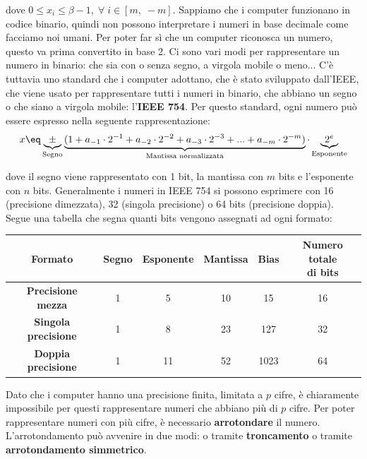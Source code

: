 dove $0 \leq x_i \leq \beta - 1, \; \forall \; i \in [m, \; -m]$.
\nl
Sappiamo che i computer funzionano in codice binario, quindi non possono interpretare i numeri in base decimale come facciamo noi umani. Per poter far sì che un computer riconosca un numero, questo va prima convertito in base 2. Ci sono vari modi per rappresentare un numero in binario: che sia con o senza segno, a virgola mobile o meno... C'è tuttavia uno standard che i computer adottano, che è stato sviluppato dall'IEEE, che viene usato per rappresentare tutti i numeri in binario, che abbiano un segno o che siano a virgola mobile: l'\textbf{IEEE 754}.
\nl
Per questo standard, ogni numero può essere espresso nella seguente rappresentazione:
\[ x \eq \underbrace{\pm}_{\text{Segno}} \underbrace{(1 + a_{-1} \cdot 2^{-1} + a_{-2} \cdot 2^{-2} + a_{-3} \cdot 2^{-3} + ... + a_{-m} \cdot 2^{-m})}_{\text{Mantissa normalizzata}} \cdot \underbrace{2^e}_{\text{Esponente}} \]

dove il segno viene rappresentato con 1 bit, la mantissa con $m$ bits e l'esponente con $n$ bits. Generalmente i numeri in IEEE 754 si possono esprimere con 16 (precisione dimezzata), 32 (singola precisione) o 64 bits (precisione doppia). Segue una tabella che segna quanti bits vengono assegnati ad ogni formato:
\begin{center}
    \begin{tabular}{|c|c|c|c|c|c|}
        \hline
        \textbf{Formato} & \textbf{Segno} & \textbf{Esponente} & \textbf{Mantissa} & \textbf{Bias} & \makecell{\textbf{Numero totale}\\\textbf{di bits}} \\
        \hline\hline
        \textbf{Precisione mezza} & 1 & 5 & 10 & 15 & 16 \\
        \hline
        \textbf{Singola precisione} & 1 & 8 & 23 & 127 & 32 \\
        \hline
        \textbf{Doppia precisione} & 1 & 11 & 52 & 1023 & 64 \\
        \hline
    \end{tabular}
\end{center}

Dato che i computer hanno una precisione finita, limitata a $p$ cifre, è chiaramente impossibile per questi rappresentare numeri che abbiano più di $p$ cifre. Per poter rappresentare numeri con più cifre, è necessario \textbf{arrotondare} il numero. L'arrotondamento può avvenire in due modi: o tramite \textbf{troncamento} o tramite \textbf{arrotondamento simmetrico}.

